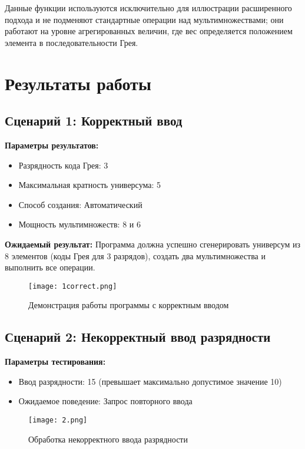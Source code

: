 \documentclass[12pt,a4paper]{article}
\begin{document}
Данные функции используются исключительно для иллюстрации расширенного подхода и не подменяют стандартные операции над мультимножествами; они работают на уровне агрегированных величин, где вес определяется положением элемента в последовательности Грея.

\newpage

\section{Результаты работы}

\subsection{Сценарий 1: Корректный ввод}

\textbf{Параметры результатов:}
\begin{itemize}
    \item Разрядность кода Грея: 3
    \item Максимальная кратность универсума: 5
    \item Способ создания: Автоматический
    \item Мощность мультимножеств: 8 и 6
\end{itemize}

\textbf{Ожидаемый результат:} Программа должна успешно сгенерировать универсум из 8 элементов (коды Грея для 3 разрядов), создать два мультимножества и выполнить все операции.

\begin{figure}[h]
    \centering
    \texttt{[image: 1correct.png]}
    \caption{Демонстрация работы программы с корректным вводом}
    \label{fig:correct_input}
\end{figure}

\subsection{Сценарий 2: Некорректный ввод разрядности}

\textbf{Параметры тестирования:}
\begin{itemize}
    \item Ввод разрядности: 15 (превышает максимально допустимое значение 10)
    \item Ожидаемое поведение: Запрос повторного ввода
\end{itemize}

\begin{figure}[h]
    \centering
    \texttt{[image: 2.png]}
    \caption{Обработка некорректного ввода разрядности}
    \label{fig:invalid_bitwidth}
\end{figure}
\end{document}
